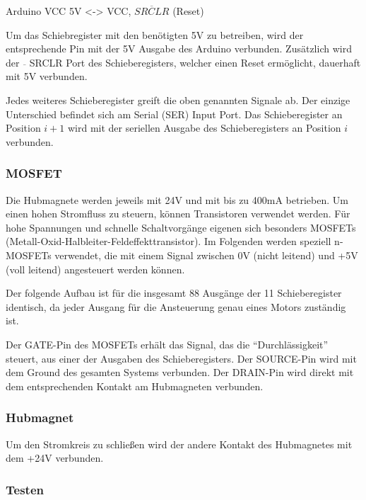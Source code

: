 Arduino VCC 5V <-> VCC, $\overline{SRCLR}$ (Reset)

Um das Schiebregister mit den benötigten 5V zu betreiben, wird der entsprechende Pin mit der 5V Ausgabe des Arduino verbunden.
Zusätzlich wird der $\overline{ }$ SRCLR Port des Schieberegisters, welcher einen Reset ermöglicht, dauerhaft mit 5V verbunden.

Jedes weiteres Schieberegister greift die oben genannten Signale ab.
Der einzige Unterschied befindet sich am Serial (SER) Input Port.
Das Schieberegister an Position $i+1$ wird mit der seriellen Ausgabe des Schieberegisters an Position $i$ verbunden.

\subsubsection{MOSFET}

Die Hubmagnete werden jeweils mit 24V und mit bis zu 400mA betrieben.
Um einen hohen Stromfluss zu steuern, können Transistoren verwendet werden.
Für hohe Spannungen und schnelle Schaltvorgänge eigenen sich besonders MOSFETs (Metall-Oxid-Halbleiter-Feldeffekttransistor). %
Im Folgenden werden speziell n-MOSFETs verwendet, die mit einem Signal zwischen 0V (nicht leitend) und +5V (voll leitend) angesteuert werden können.

Der folgende Aufbau ist für die insgesamt 88 Ausgänge der 11 Schieberegister identisch, da jeder Ausgang für die Ansteuerung genau eines Motors zuständig ist.

Der GATE-Pin des MOSFETs erhält das Signal, das die \enquote{Durchlässigkeit} steuert, aus einer der Ausgaben des Schieberegisters.
Der SOURCE-Pin wird mit dem Ground des gesamten Systems verbunden.
Der DRAIN-Pin wird direkt mit dem entsprechenden Kontakt am Hubmagneten verbunden.

\subsubsection{Hubmagnet} %

Um den Stromkreis zu schließen wird der andere Kontakt des Hubmagnetes mit dem +24V verbunden.

\subsubsection{Testen}

